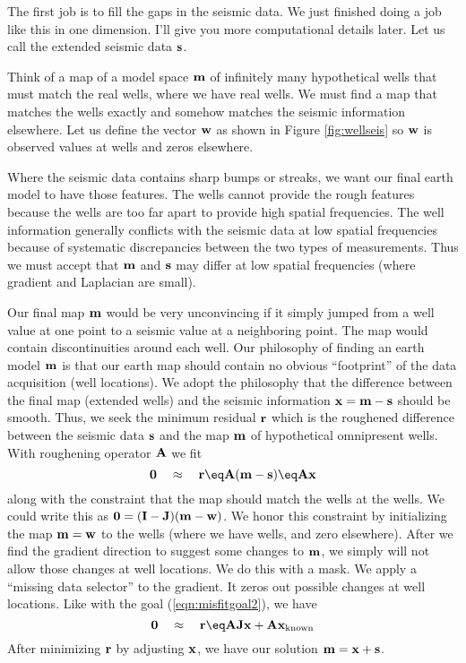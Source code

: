 \par
The first job is to fill the gaps in the seismic data.
We just finished doing a job like this in one dimension.
I'll give you more computational details later.
Let us call the extended seismic data  $\bold s$.

\par
Think of a map of a model space $\bold m$
of infinitely many hypothetical wells that must match the real wells,
where we have real wells.
We must find a map that matches the wells exactly
and somehow matches the seismic information elsewhere.
Let us define the vector $\bold w$ as shown in Figure \ref{fig:wellseis}
so $\bold w$ is
observed values at wells and zeros elsewhere.

\par
Where the seismic data contains sharp bumps or streaks,
we want our final earth model to have those features.
The wells cannot provide the rough features because the wells
are too far apart to provide high spatial frequencies.
The well information generally conflicts with the seismic data 
at low spatial frequencies because of systematic discrepancies between
the two types of measurements.
Thus we must accept that $\bold m$ and $\bold s$ may differ
at low spatial frequencies (where gradient and Laplacian are small).

\par
Our final map $\bold m$ would be very unconvincing if
it simply jumped from a well value at one point
to a seismic value at a neighboring point.
The map would contain discontinuities around each well.
Our philosophy of finding an earth model $\bold m$
is that our earth map should contain no obvious 
``footprint'' of the data acquisition (well locations).
We adopt the philosophy that the difference
between the final map (extended wells)
and the seismic information $\bold x=\bold m-\bold s$ should be smooth.
Thus,
we seek the minimum residual $\bold r$
which is the roughened difference between the seismic data $\bold s$
and the map $\bold m$ of hypothetical omnipresent wells.
With roughening operator $\bold A$ we fit
\begin{equation}
\bold 0\quad\approx\quad \bold r \eq \bold A ( \bold m - \bold s )
	\eq \bold A \bold x
\label{eqn:unconmap}
\end{equation}
along with the constraint
that the map should match the wells at the wells.
We could write this as
$\bold 0 = (\bold I-\bold J) ( \bold m - \bold w )$.
We honor this constraint by initializing the map $\bold m = \bold w$
to the wells (where we have wells, and zero elsewhere).
After we find the gradient direction to suggest some changes
to $\bold m$, we simply will not allow those changes at well locations.
We do this with a mask.
We apply a ``missing data selector'' to the gradient.
It zeros out possible changes at well locations.
Like with the goal (\ref{eqn:misfitgoal2}),
we have
\begin{equation}
\bold 0\quad\approx\quad \bold r \eq
\bold A \bold J \bold x + \bold A \bold x_{\rm known}
\end{equation}
After minimizing $\bold r$ by adjusting $\bold x$,
we have our solution $ \bold m =  \bold x + \bold s $.

